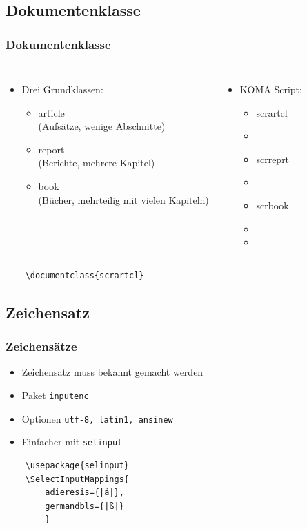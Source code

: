\documentclass[svgnames]{beamer}
\begin{document}
\subsection{Dokumenten\-klasse}
\begin{frame}[fragile] %
	\frametitle{Dokumentenklasse} %
	\begin{columns}
		\begin{itemize}[<+->]
			\item Drei Grundklassen:
			\begin{itemize}[<+->]
				\item article \\(Aufsätze, wenige Abschnitte)
				\item report \\(Berichte, mehrere Kapitel)
				\item book \\(Bücher, mehrteilig mit vielen Kapiteln)
			\end{itemize}
		\end{itemize}
		\pause
		\begin{itemize}
			\item KOMA Script:
			\begin{itemize}
				\item scrartcl
				\item[] 
				\item scrreprt
				\item[] 
				\item scrbook
				\item[] 
				\item[]
			\end{itemize}
		\end{itemize}
	\end{columns}
	\pause
	\vspace*{\baselineskip}
	\begin{lstlisting}
	\documentclass{scrartcl}
	\end{lstlisting}
\end{frame}
\subsection{Zeichensatz}
\begin{frame}[fragile] %
	\frametitle{Zeichensätze} %
	\begin{itemize}
		\item Zeichensatz muss bekannt gemacht werden\pause
		\item Paket \lstinline|inputenc|\pause
		\item Optionen \lstinline|utf-8, latin1, ansinew|\pause
		\item Einfacher mit \lstinline|selinput|\pause
	\end{itemize}
	\vspace*{\baselineskip}
	\begin{lstlisting}
	\usepackage{selinput}
	\SelectInputMappings{
		adieresis={|ä|},
		germandbls={|ß|}
		}
	\end{lstlisting}
\end{frame}
\end{document}
